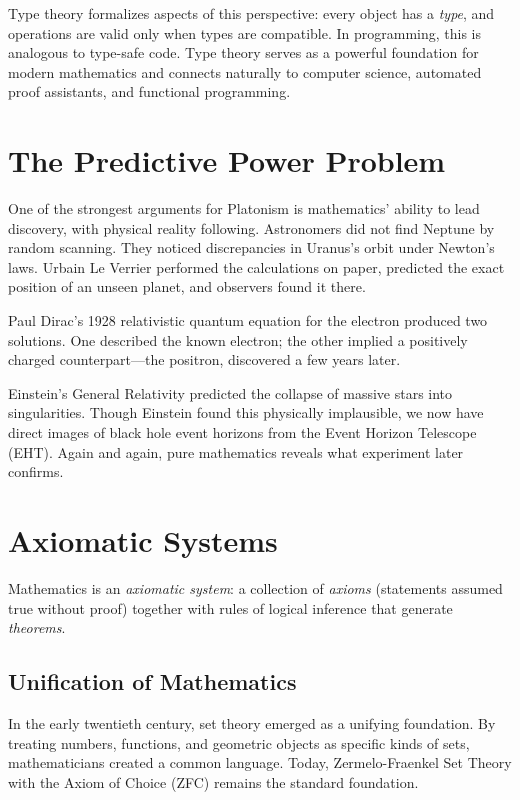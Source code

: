 Type theory formalizes aspects of this perspective: every object has a \emph{type}, and operations are valid only when types are compatible.
In programming, this is analogous to type-safe code.
Type theory serves as a powerful foundation for modern mathematics and connects naturally to computer science, automated proof assistants, and functional programming.

\section{The Predictive Power Problem}

One of the strongest arguments for Platonism is mathematics' ability to lead discovery, with physical reality following.
Astronomers did not find Neptune by random scanning.
They noticed discrepancies in Uranus's orbit under Newton's laws.
Urbain Le Verrier performed the calculations on paper, predicted the exact position of an unseen planet, and observers found it there.

Paul Dirac's 1928 relativistic quantum equation for the electron produced two solutions.
One described the known electron; the other implied a positively charged counterpart---the positron, discovered a few years later.

Einstein's General Relativity predicted the collapse of massive stars into singularities.
Though Einstein found this physically implausible, we now have direct images of black hole event horizons from the Event Horizon Telescope (EHT).
Again and again, pure mathematics reveals what experiment later confirms.

\section{Axiomatic Systems}

Mathematics is an \emph{axiomatic system}: a collection of \emph{axioms} (statements assumed true without proof) together with rules of logical inference that generate \emph{theorems}.

\subsection*{Unification of Mathematics}

In the early twentieth century, set theory emerged as a unifying foundation.
By treating numbers, functions, and geometric objects as specific kinds of sets, mathematicians created a common language.
Today, Zermelo-Fraenkel Set Theory with the Axiom of Choice (ZFC) remains the standard foundation.


